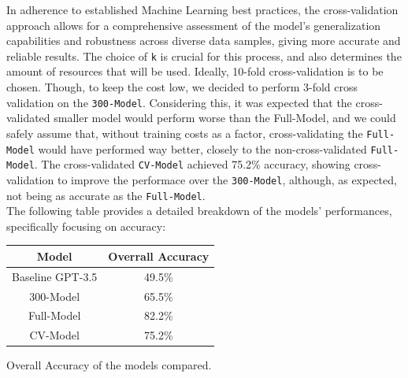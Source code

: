 \documentclass[10pt,twocolumn,letterpaper]{article}
\begin{document}
In adherence to established Machine Learning best practices, the cross-validation approach allows for a comprehensive assessment 
of the model's generalization capabilities and robustness across diverse data samples, giving more accurate and reliable results. The choice of \texttt{k} 
is crucial for this process, and also determines the amount of resources that will be used. Ideally, 10-fold cross-validation is to be chosen.
Though, to keep the cost low, we decided to perform 3-fold cross validation on the \texttt{300-Model}. Considering this, it was expected that the cross-validated
smaller model would perform worse than the Full-Model, and we could safely assume that, without training costs as a factor, cross-validating the \texttt{Full-Model}
would have performed way better, closely to the non-cross-validated \texttt{Full-Model}.
The cross-validated \texttt{CV-Model} achieved 75.2\% accuracy, showing cross-validation to improve the performace over the \texttt{300-Model},
although, as expected, not being as accurate as the \texttt{Full-Model}. \\

The following table provides a detailed breakdown of the models' performances,
specifically focusing on accuracy:

\begin{center}

    \begin{tabular}{cc}
        \toprule
        Model & Overrall Accuracy \\
        \midrule
        Baseline GPT-3.5  & 49.5\% \\
        \midrule
        300-Model & 65.5\% \\
        \midrule
        Full-Model & 82.2\% \\
         \midrule
        CV-Model & 75.2\% \\
        \bottomrule
    \end{tabular}
    
\end{center}

\begin{center}
\small {Overall Accuracy of the models compared.}
\end{center}
\end{document}
